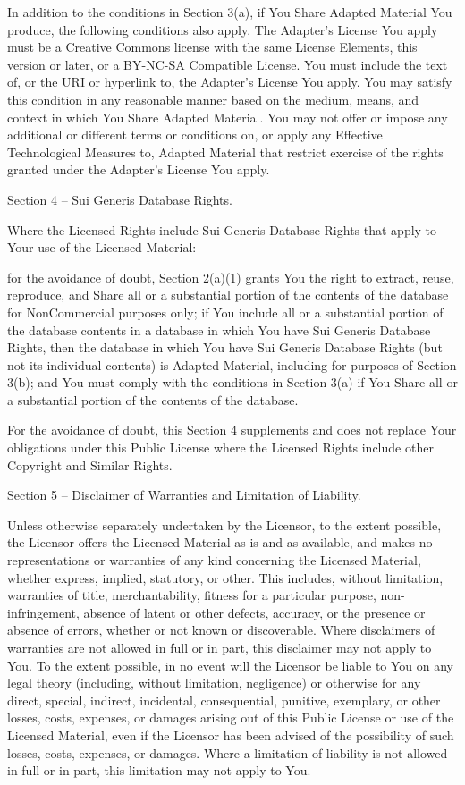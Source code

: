 {    In addition to the conditions in Section 3(a), if You Share Adapted Material You produce, the following conditions also apply.
        The Adapter’s License You apply must be a Creative Commons license with the same License Elements, this version or later, or a BY-NC-SA Compatible License.
        You must include the text of, or the URI or hyperlink to, the Adapter's License You apply. You may satisfy this condition in any reasonable manner based on the medium, means, and context in which You Share Adapted Material.
        You may not offer or impose any additional or different terms or conditions on, or apply any Effective Technological Measures to, Adapted Material that restrict exercise of the rights granted under the Adapter's License You apply.

Section 4 – Sui Generis Database Rights.

Where the Licensed Rights include Sui Generis Database Rights that apply to Your use of the Licensed Material:

    for the avoidance of doubt, Section 2(a)(1) grants You the right to extract, reuse, reproduce, and Share all or a substantial portion of the contents of the database for NonCommercial purposes only;
    if You include all or a substantial portion of the database contents in a database in which You have Sui Generis Database Rights, then the database in which You have Sui Generis Database Rights (but not its individual contents) is Adapted Material, including for purposes of Section 3(b); and
    You must comply with the conditions in Section 3(a) if You Share all or a substantial portion of the contents of the database.

For the avoidance of doubt, this Section 4 supplements and does not replace Your obligations under this Public License where the Licensed Rights include other Copyright and Similar Rights.

Section 5 – Disclaimer of Warranties and Limitation of Liability.

    Unless otherwise separately undertaken by the Licensor, to the extent possible, the Licensor offers the Licensed Material as-is and as-available, and makes no representations or warranties of any kind concerning the Licensed Material, whether express, implied, statutory, or other. This includes, without limitation, warranties of title, merchantability, fitness for a particular purpose, non-infringement, absence of latent or other defects, accuracy, or the presence or absence of errors, whether or not known or discoverable. Where disclaimers of warranties are not allowed in full or in part, this disclaimer may not apply to You.
    To the extent possible, in no event will the Licensor be liable to You on any legal theory (including, without limitation, negligence) or otherwise for any direct, special, indirect, incidental, consequential, punitive, exemplary, or other losses, costs, expenses, or damages arising out of this Public License or use of the Licensed Material, even if the Licensor has been advised of the possibility of such losses, costs, expenses, or damages. Where a limitation of liability is not allowed in full or in part, this limitation may not apply to You.

}
